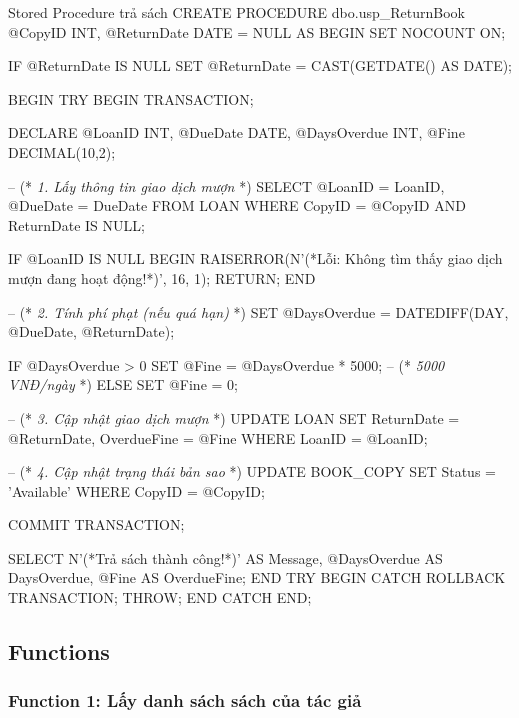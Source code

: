 \documentclass[12pt,a4paper]{article}
\newcommand{\vncomment}[1]{\textit{\color{green!50!black}#1}}
\begin{document}
\begin{sqlcode}{Stored Procedure trả sách}
CREATE PROCEDURE dbo.usp_ReturnBook
    @CopyID      INT,
    @ReturnDate  DATE = NULL
AS
BEGIN
    SET NOCOUNT ON;

    IF @ReturnDate IS NULL
        SET @ReturnDate = CAST(GETDATE() AS DATE);

    BEGIN TRY
        BEGIN TRANSACTION;

        DECLARE @LoanID INT, @DueDate DATE, @DaysOverdue INT, @Fine DECIMAL(10,2);

        -- (* \vncomment{1. Lấy thông tin giao dịch mượn} *)
        SELECT @LoanID = LoanID, @DueDate = DueDate
        FROM LOAN
        WHERE CopyID = @CopyID AND ReturnDate IS NULL;

        IF @LoanID IS NULL
        BEGIN
            RAISERROR(N'(*Lỗi: Không tìm thấy giao dịch mượn đang hoạt động!*)', 16, 1);
            RETURN;
        END

        -- (* \vncomment{2. Tính phí phạt (nếu quá hạn)} *)
        SET @DaysOverdue = DATEDIFF(DAY, @DueDate, @ReturnDate);

        IF @DaysOverdue > 0
            SET @Fine = @DaysOverdue * 5000; -- (* \vncomment{5000 VNĐ/ngày} *)
        ELSE
            SET @Fine = 0;

        -- (* \vncomment{3. Cập nhật giao dịch mượn} *)
        UPDATE LOAN
        SET ReturnDate = @ReturnDate,
            OverdueFine = @Fine
        WHERE LoanID = @LoanID;

        -- (* \vncomment{4. Cập nhật trạng thái bản sao} *)
        UPDATE BOOK_COPY
        SET Status = 'Available'
        WHERE CopyID = @CopyID;

        COMMIT TRANSACTION;

        SELECT N'(*Trả sách thành công!*)' AS Message,
               @DaysOverdue AS DaysOverdue,
               @Fine AS OverdueFine;
    END TRY
    BEGIN CATCH
        ROLLBACK TRANSACTION;
        THROW;
    END CATCH
END;
\end{sqlcode}

\subsection{Functions}

\subsubsection{Function 1: Lấy danh sách sách của tác giả}
\end{document}
